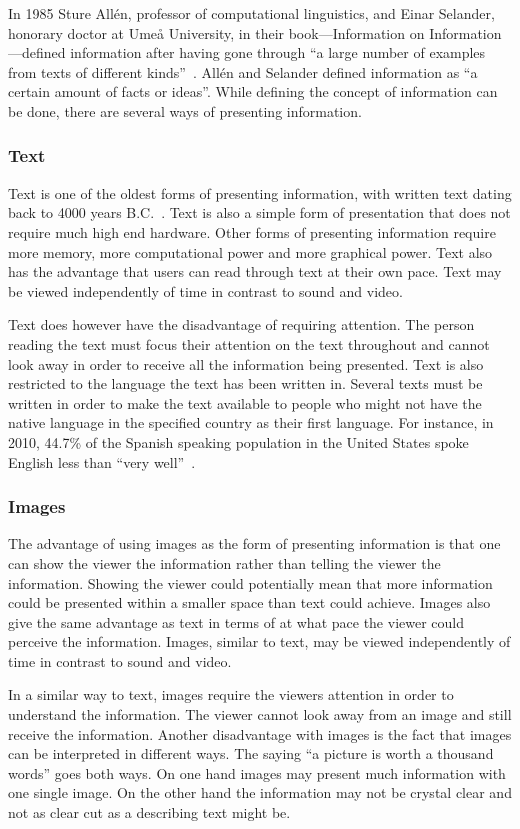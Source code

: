 In 1985 Sture All{\'e}n, professor of computational linguistics, and Einar Selander, honorary doctor at Ume{\aa} University, in their book---Information on Information---defined information after having gone through ``a large number of examples from texts of different kinds''~\cite{informationDef1}. All{\'e}n and Selander defined information as ``a certain amount of facts or ideas''. While defining the concept of information can be done, there are several ways of presenting information.

\subsubsection{Text}
Text is one of the oldest forms of presenting information, with written text dating back to 4000 years B.C.~\cite{cuneiform}. Text is also a simple form of presentation that does not require much high end hardware. Other forms of presenting information require more memory, more computational power and more graphical power. Text also has the advantage that users can read through text at their own pace. Text may be viewed independently of time in contrast to sound and video.

Text does however have the disadvantage of requiring attention. The person reading the text must focus their attention on the text throughout and cannot look away in order to receive all the information being presented. Text is also restricted to the language the text has been written in. Several texts must be written in order to make the text available to people who might not have the native language in the specified country as their first language. For instance, in 2010, 44.7\% of the Spanish speaking population in the United States spoke English less than ``very well''~\cite{spanishUS}.

\subsubsection{Images}
The advantage of using images as the form of presenting information is that one can show the viewer the information rather than telling the viewer the information. Showing the viewer could potentially mean that more information could be presented within a smaller space than text could achieve. Images also give the same advantage as text in terms of at what pace the viewer could perceive the information. Images, similar to text, may be viewed independently of time in contrast to sound and video.

In a similar way to text, images require the viewers attention in order to understand the information. The viewer cannot look away from an image and still receive the information. Another disadvantage with images is the fact that images can be interpreted in different ways. The saying ``a picture is worth a thousand words'' goes both ways. On one hand images may present much information with one single image. On the other hand the information may not be crystal clear and not as clear cut as a describing text might be.


